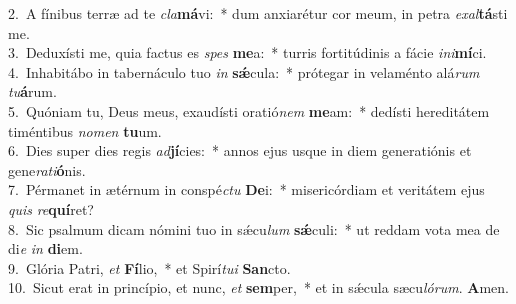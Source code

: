 {2.~}A fínibus terræ ad te \textit{cla}\textbf{má}vi:~* dum anxiarétur cor meum, in petra \textit{e}\textit{xal}\textbf{tá}sti me.\\
{3.~}Deduxísti me, quia factus es \textit{spes} \textbf{me}a:~* turris fortitúdinis a fácie \textit{i}\textit{ni}\textbf{mí}ci.\\
{4.~}Inhabitábo in tabernáculo tuo \textit{in} \textbf{sǽ}cula:~* prótegar in velaménto alá\textit{rum} \textit{tu}\textbf{á}rum.\\
{5.~}Quóniam tu, Deus meus, exaudísti oratió\textit{nem} \textbf{me}am:~* dedísti hereditátem timéntibus \textit{no}\textit{men} \textbf{tu}um.\\
{6.~}Dies super dies regis \textit{ad}\textbf{jí}cies:~* annos ejus usque in diem generatiónis et gene\textit{ra}\textit{ti}\textbf{ó}nis.\\
{7.~}Pérmanet in ætérnum in conspé\textit{ctu} \textbf{De}i:~* misericórdiam et veritátem ejus \textit{quis} \textit{re}\textbf{quí}ret?\\
{8.~}Sic psalmum dicam nómini tuo in sǽcu\textit{lum} \textbf{sǽ}culi:~* ut reddam vota mea de di\textit{e} \textit{in} \textbf{di}em.\\
{9.~}Glória Patri, \textit{et} \textbf{Fí}lio,~* et Spirí\textit{tu}\textit{i} \textbf{San}cto.\\
{10.~}Sicut erat in princípio, et nunc, \textit{et} \textbf{sem}per,~* et in sǽcula sæcu\textit{ló}\textit{rum}. \textbf{A}men.\\
